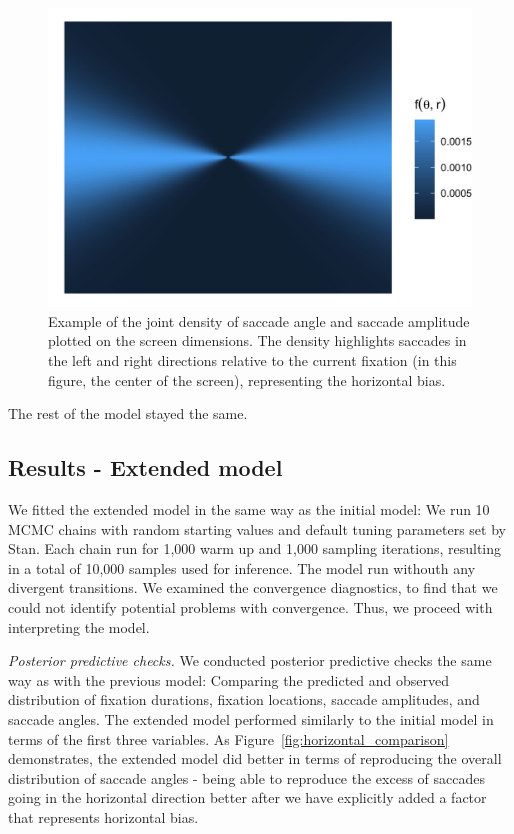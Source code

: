 \documentclass{article}
\begin{document}
\begin{figure}
    \centering
    \includegraphics[width=\linewidth]{figures/horizontal_example.jpg}
    \caption{Example of the joint density of saccade angle and saccade amplitude plotted on the screen dimensions. The density highlights saccades in the left and right directions relative to the current fixation (in this figure, the center of the screen), representing the horizontal bias.}
    \label{fig:horizontal_example}
\end{figure}

The rest of the model stayed the same.

\subsection{Results - Extended model}

We fitted the extended model in the same way as the initial model: We run 10 MCMC chains with random starting values and default tuning parameters set by Stan. Each chain run for 1,000 warm up and 1,000 sampling iterations, resulting in a total of 10,000 samples used for inference. The model run withouth any divergent transitions. We examined the convergence diagnostics, to find that we could not identify potential problems with convergence. Thus, we proceed with interpreting the model.

\textit{Posterior predictive checks.} We conducted posterior predictive checks the same way as with the previous model: Comparing the predicted and observed distribution of fixation durations, fixation locations, saccade amplitudes, and saccade angles. The extended model performed similarly to the initial model in terms of the first three variables. As Figure~\ref{fig:horizontal_comparison} demonstrates, the extended model did better in terms of reproducing the overall distribution of saccade angles - being able to reproduce the excess of saccades going in the horizontal direction better after we have explicitly added a factor that represents horizontal bias.
\end{document}
